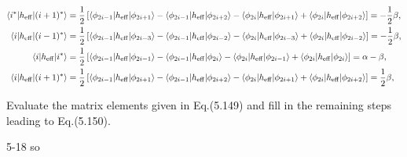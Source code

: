 \documentclass[a4paper]{book}
\newcommand{\heff}{h_{\rm eff}}
\begin{document}
\begin{solution}
\begin{align*}
		\langle i^* | \heff | (i+1)^* \rangle &= \frac{1}{2} \left[ \langle \phi_{2i-1} | \heff | \phi_{2i+1} \rangle - \langle \phi_{2i-1} | \heff | \phi_{2i+2} \rangle - \langle \phi_{2i} | \heff | \phi_{2i+1} \rangle + \langle \phi_{2i} | \heff | \phi_{2i+2} \rangle \right] = -\frac{1}{2} \beta , \\
		\langle i | \heff | (i-1)^* \rangle &= \frac{1}{2} \left[ \langle \phi_{2i-1} | \heff | \phi_{2i-3} \rangle - \langle \phi_{2i-1} | \heff | \phi_{2i-2} \rangle - \langle \phi_{2i} | \heff | \phi_{2i-3} \rangle + \langle \phi_{2i} | \heff | \phi_{2i-2} \rangle \right] = - \frac{1}{2} \beta , \\
		\langle i | \heff | i^* \rangle &= \frac{1}{2} \left[ \langle \phi_{2i-1} | \heff | \phi_{2i-1} \rangle - \langle \phi_{2i-1} | \heff | \phi_{2i} \rangle - \langle \phi_{2i} | \heff | \phi_{2i-1} \rangle + \langle \phi_{2i} | \heff | \phi_{2i} \rangle \right] = \alpha - \beta , \\
		\langle i | \heff | (i+1)^* \rangle &= \frac{1}{2} \left[ \langle \phi_{2i-1} | \heff | \phi_{2i+1} \rangle - \langle \phi_{2i-1} | \heff | \phi_{2i+2} \rangle - \langle \phi_{2i} | \heff | \phi_{2i+1} \rangle + \langle \phi_{2i} | \heff | \phi_{2i+2} \rangle \right] = \frac{1}{2} \beta , \\
	\end{align*}		
	
	\end{solution}
	
	\begin{exercise}
	Evaluate the matrix elements given in Eq.(5.149) and fill in the remaining steps leading to Eq.(5.150).
	\end{exercise}
	
	\begin{solution}
		5-18 so
	\end{solution}
	
\end{document}
